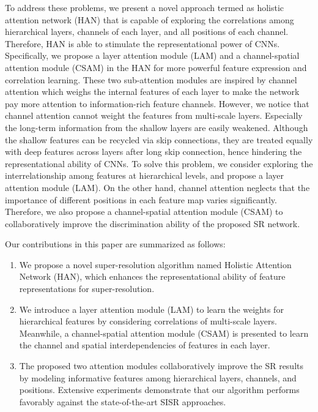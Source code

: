 \documentclass[runningheads]{llncs}
\begin{document}
To address these problems, we present a novel approach termed as holistic attention network (HAN) that is capable of exploring the correlations among hierarchical layers, channels of each layer, and all positions of each channel. Therefore, HAN is able to stimulate the representational power of CNNs.
Specifically, we propose a layer attention module (LAM) and a channel-spatial attention module (CSAM) in the HAN for more powerful feature expression and correlation learning. 
These two sub-attention modules are inspired by channel attention \cite{zhang2018image} which weighs the internal features of each layer to make the network pay more attention to information-rich feature channels.
However, we notice that channel attention cannot weight the features from multi-scale layers. Especially the long-term information from the shallow layers are easily weakened. Although the shallow features can be recycled via skip connections, they are treated equally with deep features across layers after long skip connection, hence hindering the representational ability of CNNs.
To solve this problem, we consider exploring the interrelationship among features at hierarchical levels, and propose a layer attention module (LAM). 
On the other hand, channel attention neglects that the importance of different positions in each feature map varies significantly. Therefore, we also propose a channel-spatial attention module (CSAM) to collaboratively improve the discrimination ability of the proposed SR network.

Our contributions in this paper are summarized as follows:

\begin{enumerate}[$\bullet$]

	\item We propose a novel super-resolution algorithm named Holistic Attention Network (HAN), which enhances the representational ability of feature representations for super-resolution.


	\item We introduce a layer attention module (LAM) to learn the weights for hierarchical features by considering correlations of multi-scale layers.
	Meanwhile, a channel-spatial attention module (CSAM) is presented to learn the channel and spatial interdependencies of features in each layer. 

\item The proposed two attention modules collaboratively improve the SR results by modeling informative features among hierarchical layers, channels, and positions. Extensive experiments demonstrate that our algorithm performs favorably against the state-of-the-art SISR approaches.


\end{enumerate}
\end{document}
